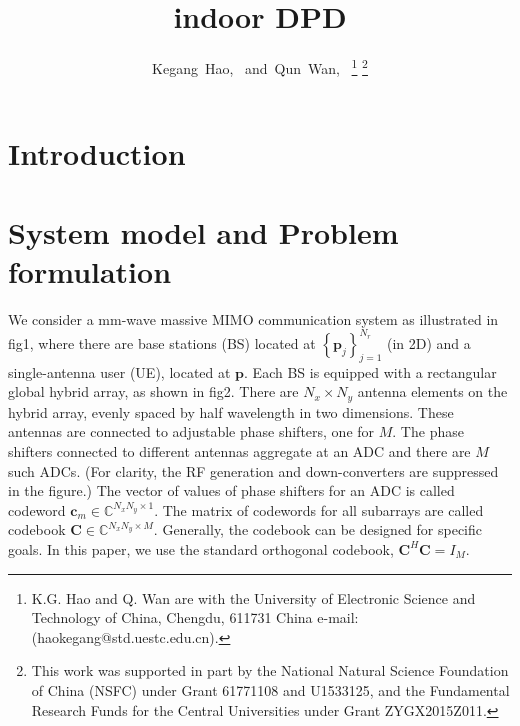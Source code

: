 \documentclass[journal]{IEEEtran}
\begin{document}
\title{indoor DPD}

\author{Kegang~Hao,~
        and~Qun~Wan,~%
\thanks{K.G. Hao and Q. Wan are with the University of Electronic Science and Technology of China, Chengdu, 611731 China e-mail: (haokegang@std.uestc.edu.cn).}%
\thanks{This work was supported in part by the National Natural Science Foundation of China (NSFC) under Grant 61771108 and U1533125, and the Fundamental Research Funds for the Central Universities under Grant ZYGX2015Z011.}
}

\maketitle

\begin{abstract}


\end{abstract}

\begin{IEEEkeywords}


\end{IEEEkeywords}


\IEEEpeerreviewmaketitle


\section{Introduction}
\label{sec:intro}
 \cite{Amar2004Direct} 


\section{System model and Problem formulation}
\label{sec:model and problem}
We consider a mm-wave massive MIMO communication system as illustrated in fig1, where there are base stations (BS) located at $\left\{\boldsymbol{p}_j\right\}_{j=1}^{N_r}$ (in 2D)
and a single-antenna user (UE), located at $\boldsymbol{p}$. Each BS is equipped with a rectangular global hybrid array, as shown in fig2.
There are $N_x\times N_y$ antenna elements on the hybrid array, evenly spaced by half wavelength in two dimensions. These antennas are connected to adjustable phase shifters, one for $M$. 
The phase shifters connected to different antennas aggregate at an ADC and there are $M$ such ADCs. (For clarity, the RF generation and down-converters are suppressed in the figure.)
The vector of values of phase shifters for an ADC is called codeword $\boldsymbol{c}_m \in \mathbb{C}^{N_xN_y \times 1}$. The matrix of codewords for all subarrays are called codebook $\boldsymbol{C}\in \mathbb{C}^{N_xN_y \times M}$.
Generally, the codebook can be designed for specific goals. In this paper, we use the standard orthogonal codebook, $\boldsymbol{C}^H\boldsymbol{C}=I_M$.
\end{document}
